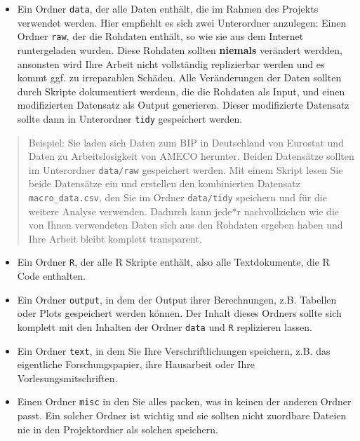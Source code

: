 \documentclass[]{tufte-book}
\providecommand{\tightlist}{%
  \setlength{\itemsep}{0pt}\setlength{\parskip}{0pt}}
\begin{document}
\begin{itemize}
\tightlist
\item
  Ein Ordner \texttt{data}, der alle Daten enthält, die im Rahmen des
  Projekts verwendet werden. Hier empfiehlt es sich zwei Unterordner
  anzulegen: Einen Ordner \texttt{raw}, der die Rohdaten enthält, so wie
  sie aus dem Internet runtergeladen wurden. Diese Rohdaten sollten
  \textbf{niemals} verändert werdden, ansonsten wird Ihre Arbeit nicht
  vollständig replizierbar werden und es kommt ggf. zu irreparablen
  Schäden. Alle Veränderungen der Daten sollten durch Skripte
  dokumentiert werdenn, die die Rohdaten als Input, und einen
  modifizierten Datensatz als Output generieren. Dieser modifizierte
  Datensatz sollte dann in Unterordner \texttt{tidy} gespeichert werden.
\end{itemize}

\begin{quote}
Beispiel: Sie laden sich Daten zum BIP in Deutschland von Eurostat und
Daten zu Arbeitslosigkeit von AMECO herunter. Beiden Datensätze sollten
im Unterordner \texttt{data/raw} gespeichert werden. Mit einem Skript
lesen Sie beide Datensätze ein und erstellen den kombinierten Datensatz
\texttt{macro\_data.csv}, den Sie im Ordner \texttt{data/tidy} speichern
und für die weitere Analyse verwenden. Dadurch kann jede*r
nachvollziehen wie die von Ihnen verwendeten Daten sich aus den Rohdaten
ergeben haben und Ihre Arbeit bleibt komplett transparent.
\end{quote}

\begin{itemize}
\item
  Ein Ordner \texttt{R}, der alle R Skripte enthält, also alle
  Textdokumente, die R Code enthalten.
\item
  Ein Ordner \texttt{output}, in dem der Output ihrer Berechnungen, z.B.
  Tabellen oder Plots gespeichert werden können. Der Inhalt dieses
  Ordners sollte sich komplett mit den Inhalten der Ordner \texttt{data}
  und \texttt{R} replizieren lassen.
\item
  Ein Ordner \texttt{text}, in dem Sie Ihre Verschriftlichungen
  speichern, z.B. das eigentliche Forschungspapier, ihre Hausarbeit oder
  Ihre Vorlesungsmitschriften.
\item
  Einen Ordner \texttt{misc} in den Sie alles packen, was in keinen der
  anderen Ordner passt. Ein solcher Ordner ist wichtig und sie sollten
  nicht zuordbare Dateien nie in den Projektordner als solchen
  speichern.
\end{itemize}
\end{document}
